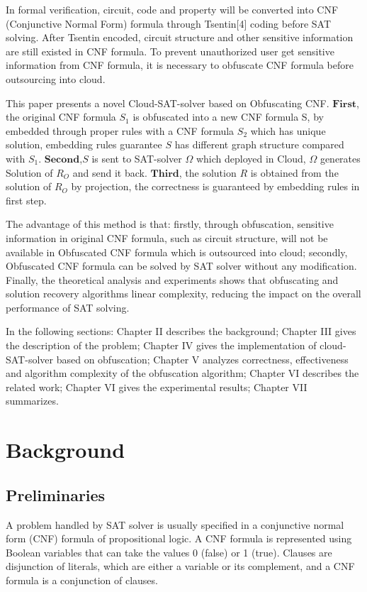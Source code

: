 \documentclass[runningheads,a4paper]{llncs}
\begin{document}
In formal verification, circuit, code and property will be converted into CNF (Conjunctive Normal Form) formula through Tsentin[4] coding before SAT solving. After Tsentin encoded, circuit structure and other sensitive information are still existed in CNF formula. 
To prevent unauthorized user get sensitive information from CNF formula, it is necessary to obfuscate CNF formula before outsourcing into cloud.

This paper presents a novel Cloud-SAT-solver based on Obfuscating CNF. 
$\mathbf{First}$, the original CNF formula $S_1$  is obfuscated into a new CNF formula S, by embedded through proper rules with a CNF formula $S_2$ which has unique solution, 
embedding rules guarantee $S$ has different graph structure compared with $S_1$.
$\mathbf{Second}$,$S$ is sent to SAT-solver $\Omega$ which deployed in Cloud, $\Omega$ generates Solution of $R_O$ and send it back. 
$\mathbf{Third}$, the solution $R$ is obtained from the solution of $R_O$ by projection, the correctness is guaranteed by embedding rules in first step.

The advantage of this method is that: firstly, through obfuscation, sensitive information in original CNF formula, such as circuit structure, will not be available in Obfuscated CNF formula which is outsourced into cloud; secondly, Obfuscated CNF formula can be solved by SAT solver without any modification. Finally, the theoretical analysis and experiments shows that obfuscating and solution recovery algorithms linear complexity, reducing the impact on the overall performance of SAT solving.

In the following sections: Chapter II describes the background; Chapter III gives the description of the problem; Chapter IV gives the implementation of cloud-SAT-solver based on obfuscation; Chapter V analyzes correctness, effectiveness and algorithm complexity of the obfuscation algorithm; Chapter VI describes the related work; Chapter VI gives the experimental results; Chapter VII summarizes.

\section{Background}
\subsection{Preliminaries}

A problem handled by SAT solver is usually specified in a conjunctive normal form (CNF) formula of propositional logic. A CNF formula is represented using Boolean variables that can take the values 0 (false) or 1 (true). Clauses are disjunction of literals, which are either a variable or its complement, and a CNF formula is a conjunction of clauses.
\end{document}
